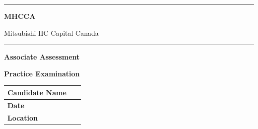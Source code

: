 \documentclass[11pt,letterpaper]{article}
\newif\ifshowsolutions
\begin{document}
\thispagestyle{empty}
\begin{center}

\vspace*{0.3cm}

\rule{\textwidth}{2pt}

\vspace{0.5cm}

{\Huge\bfseries\color{mhcblue} MHCCA}

\vspace{0.2cm}

{\Large\color{mhcblue} Mitsubishi HC Capital Canada}

\vspace{0.5cm}

\rule{\textwidth}{1pt}

\vspace{0.5cm}

{\LARGE\bfseries Associate Assessment}

\vspace{0.2cm}

{\LARGE\bfseries Practice Examination}

\ifshowsolutions
\vspace{0.3cm}
{\LARGE\bfseries\color{red} --- ANSWER KEY ---}
\fi

\vspace{0.7cm}

\begin{tabular}{|p{3.5cm}|p{8cm}|}
\hline
\rowcolor{lightgray} \textbf{Candidate Name} & \hspace{7cm}~ \\[0.3cm]
\hline
\rowcolor{lightgray} \textbf{Date} & \hspace{7cm}~ \\[0.3cm]
\hline
\rowcolor{lightgray} \textbf{Location} & \hspace{7cm}~ \\[0.3cm]
\hline
\end{tabular}

\vspace{0.7cm}


\end{center}
\end{document}
